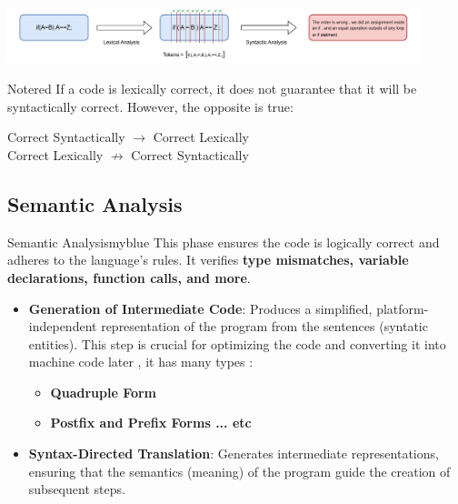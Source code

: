 \vspace{0.35cm}
\begin{center}
    \includegraphics[height=0.14\textheight,width=0.9\textwidth]{Chapters/Examples/Intro/ex3.drawio.pdf}
\end{center}

\vspace{0.5cm}

\begin{prettyBox}{Note}{red}
If a code is lexically correct, it does not guarantee that it will be syntactically correct. However, the opposite is true:

\begin{center}
    Correct Syntactically $\rightarrow$ Correct Lexically \\[0.15cm]
    Correct Lexically $\nrightarrow$ Correct Syntactically
\end{center}

\end{prettyBox}

\vspace{0.35cm}

\subsection{Semantic Analysis}
\begin{prettyBox}{Semantic Analysis}{myblue}
This phase ensures the code is logically correct and adheres to the language's rules. It verifies \textbf{type mismatches, variable declarations, function calls, and more}.

\begin{itemize}
    \item \textbf{Generation of Intermediate Code}: 
    Produces a simplified, platform-independent representation of the program from the sentences (syntatic entities). This step is crucial for optimizing the code and converting it into machine code later , it has many types :
    \begin{itemize}
        \item \textbf{Quadruple Form}
        \item \textbf{Postfix and Prefix Forms ... etc}
    \end{itemize}

    \item \textbf{Syntax-Directed Translation}: 
    Generates intermediate representations, ensuring that the semantics (meaning) of the program guide the creation of subsequent steps.
\end{itemize}
\end{prettyBox}

